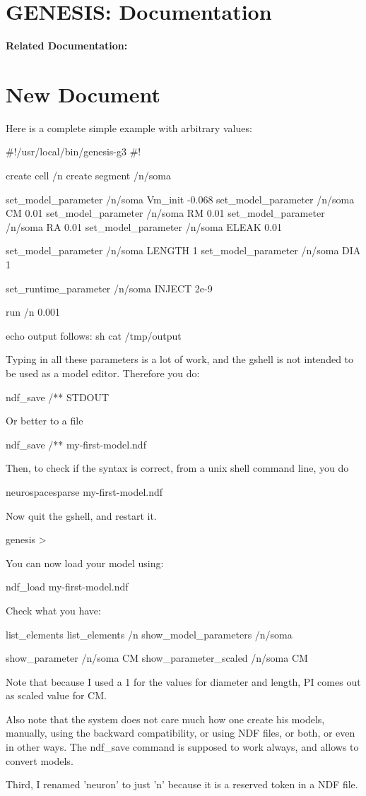\documentclass[12pt]{article}
\begin{document}
\section*{GENESIS: Documentation}

{\bf Related Documentation:}

\section*{New Document}

Here is a
complete simple example with arbitrary values:

#!/usr/local/bin/genesis-g3
#!

create cell /n
create segment /n/soma

set_model_parameter /n/soma Vm_init -0.068
set_model_parameter /n/soma CM 0.01
set_model_parameter /n/soma RM 0.01
set_model_parameter /n/soma RA 0.01
set_model_parameter /n/soma ELEAK 0.01

set_model_parameter /n/soma LENGTH 1
set_model_parameter /n/soma DIA 1

set_runtime_parameter /n/soma INJECT 2e-9

run /n 0.001

echo output follows:\n
sh cat /tmp/output

Typing in all these parameters is a lot of work, and the gshell is not
intended to be used as a model editor.  Therefore you do:

ndf_save /** STDOUT

Or better to a file

ndf_save /** my-first-model.ndf

Then, to check if the syntax is correct, from a unix shell command line, you do

neurospacesparse my-first-model.ndf

Now quit the gshell, and restart it.

genesis >

You can now load your model using:

ndf_load my-first-model.ndf

Check what you have:

list_elements
list_elements /n
show_model_parameters /n/soma

show_parameter /n/soma CM
show_parameter_scaled /n/soma CM

Note that because I used a 1 for the values for diameter and length,
PI comes out as scaled value for CM.

Also note that the system does not care much how one create his
models, manually, using the backward compatibility, or using NDF
files, or both, or even in other ways.  The ndf_save command is
supposed to work always, and allows to convert models.

Third, I renamed 'neuron' to just 'n' because it is a reserved token
in a NDF file.
\end{document}
